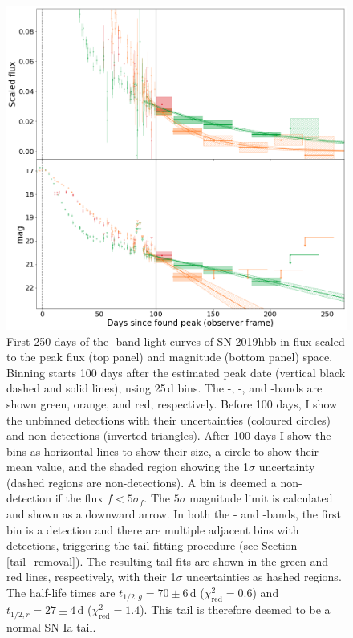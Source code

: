 \documentclass[a4paper,oneside,12pt, class=Latex/Classes/PhDthesisPSnPDF, crop=false]{standalone}
\begin{document}
\begin{figure}
 \centering
 \includegraphics[width=\textwidth]{../Images/chapter_3/bin_showcase.png}
 \caption{First 250 days of the \ztfg\ztfr\ztfi-band light curves of SN 2019hbb in flux scaled to the peak flux (top panel) and magnitude (bottom panel) space. Binning starts 100 days after the estimated peak date (vertical black dashed and solid lines), using 25\,d bins. The \ztfg-, \ztfr-, and \ztfi-bands are shown green, orange, and red, respectively. Before 100 days, I show the unbinned detections with their uncertainties (coloured circles) and non-detections (inverted triangles). After 100 days I show the bins as horizontal lines to show their size, a circle to show their mean value, and the shaded region showing the 1$\sigma$ uncertainty (dashed regions are non-detections). A bin is deemed a non-detection if the flux $f<5\sigma_f$. The $5\sigma$ magnitude limit is calculated and shown as a downward arrow. In both the \ztfg- and \ztfr-bands, the first bin is a detection and there are multiple adjacent bins with detections, triggering the tail-fitting procedure (see Section \ref{tail_removal}). The resulting tail fits are shown in the green and red lines, respectively, with their 1$\sigma$ uncertainties as hashed regions. The half-life times are $t_{1/2,g} = 70 \pm 6$\,d ($\chi^2_\text{red} = 0.6$) and $t_{1/2,r} = 27 \pm 4$\,d ($\chi^2_\text{red} = 1.4$). This tail is therefore deemed to be a normal SN Ia tail.}
 \label{bin_showcase}
\end{figure}
\end{document}
